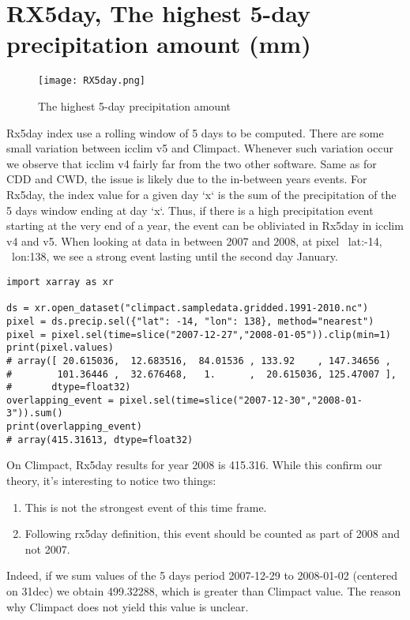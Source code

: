 \documentclass[a4paper,11pt]{article}
\begin{document}
    \section{RX5day, The highest 5-day precipitation amount (mm)}
        \begin{figure}[h]
            \centering
            \texttt{[image: RX5day.png]}
            \caption{The highest 5-day precipitation amount}
            \label{figure/rx5day}
        \end{figure}
        Rx5day index use a rolling window of 5 days to be computed.
        There are some small variation between icclim v5 and Climpact. Whenever such variation occur we observe that icclim v4 fairly far from 
        the two other software.
        Same as for CDD and CWD, the issue is likely due to the in-between years events.
        For Rx5day, the index value for a given day `x` is the sum of the precipitation of the 5 days window ending at day `x`.
        Thus, if there is a high precipitation event starting at the very end of a year, the event can be obliviated in Rx5day in icclim v4 and v5.
        When looking at data in between 2007 and 2008, at pixel ~lat:-14, ~lon:138, we see a strong event lasting until the second day January.
        \begin{minipage}{\linewidth}
        \begin{lstlisting}
import xarray as xr

ds = xr.open_dataset("climpact.sampledata.gridded.1991-2010.nc")
pixel = ds.precip.sel({"lat": -14, "lon": 138}, method="nearest")
pixel = pixel.sel(time=slice("2007-12-27","2008-01-05")).clip(min=1)
print(pixel.values)
# array([ 20.615036,  12.683516,  84.01536 , 133.92    , 147.34656 ,
#        101.36446 ,  32.676468,   1.      ,  20.615036, 125.47007 ],
#       dtype=float32)
overlapping_event = pixel.sel(time=slice("2007-12-30","2008-01-3")).sum()
print(overlapping_event)
# array(415.31613, dtype=float32)
        \end{lstlisting}
        \end{minipage}

        On Climpact, Rx5day results for year 2008 is 415.316. While this confirm our theory, it's interesting to notice two things:
        \begin{enumerate}
            \item This is not the strongest event of this time frame.
            \item Following rx5day definition, this event should be counted as part of 2008 and not 2007.
        \end{enumerate}
        Indeed, if we sum values of the 5 days period 2007-12-29 to 2008-01-02 (centered on 31dec) we obtain 499.32288, 
        which is greater than Climpact value.
        The reason why Climpact does not yield this value is unclear.
\end{document}
